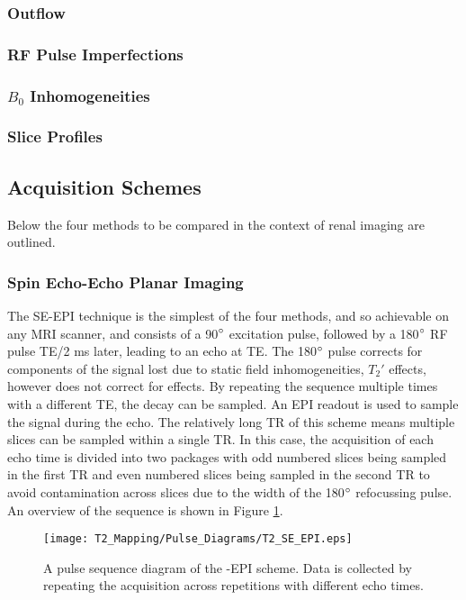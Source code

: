 \subsubsection{Outflow}

\subsubsection{RF Pulse Imperfections}

\subsubsection{$B_0$ Inhomogeneities}

\subsubsection{Slice Profiles}

\subsection{\ttwo Acquisition Schemes}
\label{subsec:t2_acquisition_schemes}
Below the four methods to be compared in the context of renal imaging are outlined.

\subsubsection{Spin Echo-Echo Planar Imaging}
The \acf{SE}-\acf{EPI} technique is the simplest of the four methods, and so achievable on any \ac{MRI} scanner, and consists of a 90$\degree$ excitation pulse, followed by a 180$\degree$ \ac{RF} pulse \ac{TE}/2 ms later, leading to an echo at \ac{TE}. The 180$\degree$ pulse corrects for components of the signal lost due to static field inhomogeneities, $T_2'$ effects, however does not correct for \ttwo effects. By repeating the sequence multiple times with a different \ac{TE}, the \ttwo decay can be sampled. An \ac{EPI} readout is used to sample the signal during the echo. The relatively long \ac{TR} of this scheme means multiple slices can be sampled within a single \ac{TR}. In this case, the acquisition of each echo time is divided into two packages with odd numbered slices being sampled in the first \ac{TR} and even numbered slices being sampled in the second \ac{TR} to avoid contamination across slices due to the width of the 180$\degree$ refocussing pulse. An overview of the sequence is shown in Figure \ref{fig:t2_se-epi_seq}.

\begin{figure}[H]
	\centering
	\texttt{[image: T2\_Mapping/Pulse\_Diagrams/T2\_SE\_EPI.eps]}
	\caption{A pulse sequence diagram of the -\ac{EPI} scheme. Data is collected by repeating the acquisition across repetitions with different echo times.}
	\label{fig:t2_se-epi_seq}	
\end{figure}

